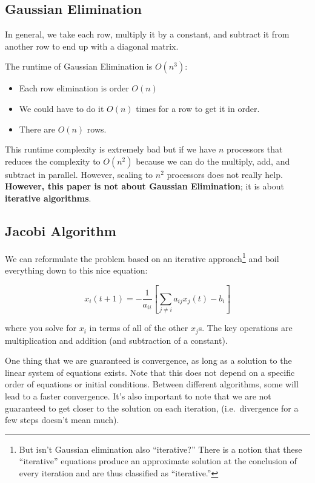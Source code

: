 \subsection{Gaussian Elimination}

In general, we take each row, multiply it by a constant, and subtract it from another row to end up with a diagonal matrix.

The runtime of Gaussian Elimination is \( O (n^3) \):
\begin{itemize}
    \item Each row elimination is order \( O(n) \)
    \item We could have to do it \( O(n) \) times for a row to get it in order.
    \item There are \( O(n) \) rows.
\end{itemize}

This runtime complexity is extremely bad but if we have \( n \) processors that reduces the complexity to \( O(n^2) \) because we can do the multiply, add, and subtract in parallel. However, scaling to \( n^2 \) processors does not really help. \textbf{However, this paper is not about Gaussian Elimination}; it is about \textbf{iterative algorithms}.

\subsection{Jacobi Algorithm}

We can reformulate the problem based on an iterative approach\footnote{But isn't Gaussian elimination also ``iterative?'' There is a notion that these ``iterative'' equations produce an approximate solution at the conclusion of every iteration and are thus classified as ``iterative.''} and boil everything down to this nice equation:

\[
x_{i}(t + 1) = -\frac{1}{a_{ii}} \left[ \sum_{j \neq i} a_{ij} x_{j} (t) - b_{i} \right]
\]

where you solve for \( x_{i} \) in terms of all of the other \( x_{j} \)s. The key operations are  multiplication and addition (and subtraction of a constant).

One thing that we are guaranteed is convergence, as long as a solution to the linear system of equations exists. Note that this does not depend on a specific order of equations or initial conditions. Between different algorithms, some will lead to a faster convergence. It's also important to note that we are not guaranteed to get closer to the solution on each iteration, (i.e.\ divergence for a few steps doesn't mean much).

